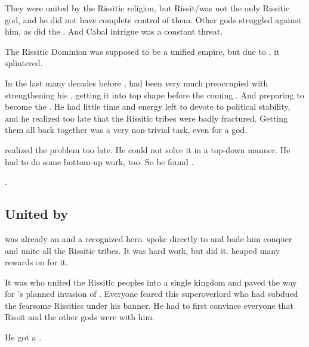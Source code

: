 They were united by the Rissitic religion, but Rissit/\Secherdamon was not the only Rissitic god, and he did not have complete control of them.
Other gods struggled against him, as did the \jinn. 
And Cabal intrigue was a constant threat. 

The Rissitic Dominion was supposed to be a unified empire, but due to , it splintered.

In the last many decades before \SentinelsofMithEmph, \Secherdamon had been very much preoccupied with strengthening his \matrix, getting it into top shape before the coming \thirdbanewar.
And preparing \Vizsherioch to become the . 
He had little time and energy left to devote to political stability, and he realized too late that the Rissitic tribes were badly fractured.
Getting them all back together was a very non-trivial task, even for a god. 

\Secherdamon realized the problem too late. 
He could not solve it in a top-down manner. 
He had to do some bottom-up work, too.
So he found \Narkiza. 

. 





\subsection{United by \Narkiza}
\Narkiza was already an \Ashenoch and a recognized hero.
\Secherdamon spoke directly to \Narkiza and bade him conquer and unite all the Rissitic tribes. 
It was hard work, but \Narkiza did it.
\Secherdamon heaped many rewards on \Narkiza for it. 


It was  who united the Rissitic peoples into a single kingdom and paved the way for \Secherdamon's planned invasion of \Velcad.
Everyone feared this super\human overlord who had subdued the fearsome Rissitics under his banner. 
He had to first convince everyone that Rissit and the other gods were with him.

He got a . 

















